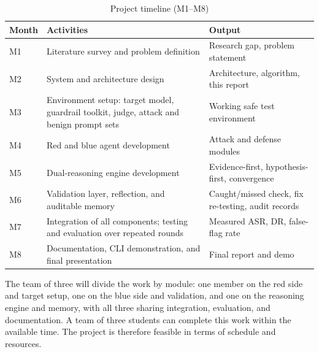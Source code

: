 \begin{table}[H]
\centering
\caption{Project timeline (M1--M8)}
\label{tab:timeline}
\begin{tabularx}{\textwidth}{@{}p{} Y p{0.24\textwidth}@{}}
\toprule
\textbf{Month} & \textbf{Activities} & \textbf{Output} \\
\midrule
M1 & Literature survey and problem definition & Research gap, problem statement \\
M2 & System and architecture design & Architecture, algorithm, this report \\
M3 & Environment setup: target model, guardrail toolkit, judge, attack and benign prompt sets & Working safe test environment \\
M4 & Red and blue agent development & Attack and defense modules \\
M5 & Dual-reasoning engine development & Evidence-first, hypothesis-first, convergence \\
M6 & Validation layer, reflection, and auditable memory & Caught/missed check, fix re-testing, audit records \\
M7 & Integration of all components; testing and evaluation over repeated rounds & Measured ASR, DR, false-flag rate \\
M8 & Documentation, CLI demonstration, and final presentation & Final report and demo \\
\bottomrule
\end{tabularx}
\end{table}

The team of three will divide the work by module: one member on the red side and
target setup, one on the blue side and validation, and one on the reasoning
engine and memory, with all three sharing integration, evaluation, and
documentation. A team of three students can complete this work within the
available time. The project is therefore feasible in terms of schedule and
resources.
